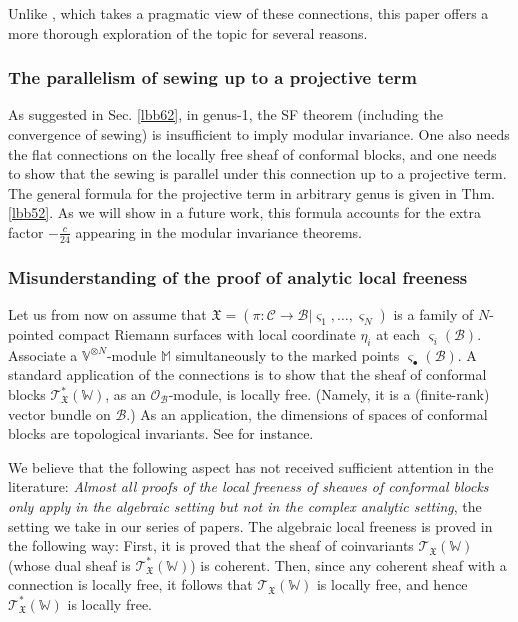 \documentclass[11pt,b5paper,notitlepage]{article}
\theoremstyle{definition}
\theoremstyle{plain}
\newcommand{\scr}{\mathscr}
\newcommand{\sgm}{\varsigma}
\newcommand{\blt}{\bullet}
\newcommand{\Vbb}{\mathbb V}
\newcommand{\Wbb}{\mathbb W}
\newcommand{\Mbb}{\mathbb M}
\newcommand{\<}{\left\langle}
\renewcommand{\>}{\right\rangle}
\newcommand{\MO}{\mathcal{O}}
\newcommand{\MC}{\mathcal{C}}
\newcommand{\MB}{\mathcal{B}}
\newcommand{\fx}{\mathfrak{X}}
\numberwithin{equation}{subsection}
\begin{document}
Unlike \cite{Gui-sewingconvergence}, which takes a pragmatic view of these connections, this paper offers a more thorough exploration of the topic for several reasons.


\subsubsection*{The parallelism of sewing up to a projective term}

As suggested in Sec. \ref{lbb62}, in genus-1, the SF theorem (including the convergence of sewing) is insufficient to imply modular invariance. One also needs the flat connections on the locally free sheaf of conformal blocks, and one needs to show that the sewing is parallel under this connection up to a projective term. The general formula for the projective term in arbitrary genus is given in Thm. \ref{lbb52}. As we will show in a future work, this formula accounts for the extra factor $-\frac c{24}$ appearing in the modular invariance theorems.


\subsubsection*{Misunderstanding of the proof of analytic local freeness}

Let us from now on assume that $\fx=(\pi:\MC\rightarrow\MB|\sgm_1,\dots,\sgm_N)$ is a family of $N$-pointed compact Riemann surfaces with local coordinate $\eta_i$ at each $\sgm_i(\MB)$. Associate a $\Vbb^{\otimes N}$-module $\Mbb$ simultaneously to the marked points $\sgm_\blt(\MB)$. A standard application of the connections is to show that the sheaf of conformal blocks $\scr T^*_\fx(\Wbb)$, as an $\MO_\MB$-module, is locally free. (Namely, it is a (finite-rank) vector bundle on $\MB$.) As an application, the dimensions of spaces of conformal blocks are topological invariants. See \cite{TUY,Ueno97,Ueno08,NT-P1_conformal_blocks,DGT2} for instance. 


We believe that the following aspect has not received sufficient attention in the literature: \textit{Almost all proofs of the local freeness of sheaves of conformal blocks only apply in the algebraic setting but not in the complex analytic setting}, the setting we take in our series of papers. The algebraic local freeness is proved in the following way: First, it is proved that the sheaf of coinvariants $\scr T_\fx(\Wbb)$ (whose dual sheaf is $\scr T_\fx^*(\Wbb)$) is coherent. Then, since any coherent sheaf with a connection is locally free, it follows that $\scr T_\fx(\Wbb)$ is locally free, and hence $\scr T_\fx^*(\Wbb)$ is locally free. 
\end{document}
